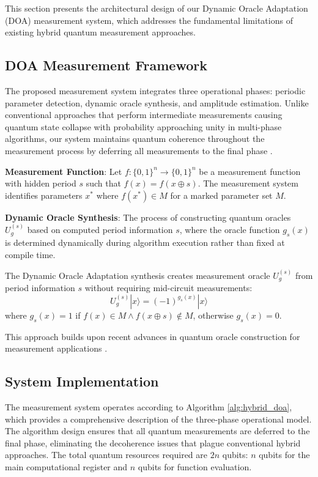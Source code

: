 \documentclass[journal]{IEEEtran}
\begin{document}
This section presents the architectural design of our Dynamic Oracle Adaptation (DOA) measurement system, which addresses the fundamental limitations of existing hybrid quantum measurement approaches.

\subsection{DOA Measurement Framework}

The proposed measurement system integrates three operational phases: periodic parameter detection, dynamic oracle synthesis, and amplitude estimation. {Unlike conventional approaches that perform intermediate measurements causing quantum state collapse with probability approaching unity in multi-phase algorithms, our system maintains quantum coherence throughout the measurement process by deferring all measurements to the final phase} \cite{10590348, schwetz2024simonalgorithmmeasurementbasedquantum}.

\textbf{Measurement Function}: Let $f: \{0,1\}^n \rightarrow \{0,1\}^n$ be a measurement function with hidden period $s$ such that $f(x) = f(x \oplus s)$. The measurement system identifies parameters $x^*$ where $f(x^*) \in M$ for a marked parameter set $M$.

\textbf{Dynamic Oracle Synthesis}: The process of constructing quantum oracles $U_g^{(s)}$ based on computed period information $s$, where the oracle function $g_s(x)$ is determined dynamically during algorithm execution rather than fixed at compile time.

The Dynamic Oracle Adaptation synthesis creates measurement oracle $U_g^{(s)}$ from period information $s$ without requiring mid-circuit measurements:
\begin{equation}
U_g^{(s)}|x\rangle = (-1)^{g_s(x)}|x\rangle
\end{equation}
where $g_s(x) = 1$ if $f(x) \in M \land f(x \oplus s) \notin M$, otherwise $g_s(x) = 0$.

This approach builds upon recent advances in quantum oracle construction for measurement applications \cite{sünkel2025quantumcircuitconstructionoptimization, 10848114}.

\subsection{System Implementation}

{The measurement system operates according to Algorithm \ref{alg:hybrid_doa}, which provides a comprehensive description of the three-phase operational model. The algorithm design ensures that all quantum measurements are deferred to the final phase, eliminating the decoherence issues that plague conventional hybrid approaches. The total quantum resources required are $2n$ qubits: $n$ qubits for the main computational register and $n$ qubits for function evaluation.}
\end{document}
